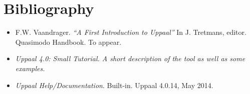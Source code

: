 \documentclass{beamer}
\begin{document}
\section{Bibliography}

\begin{frame}
	\begin{itemize}
		\item F.W. Vaandrager. \textit{``A First Introduction to Uppaal''} In J. Tretmans, editor. Quasimodo Handbook. To appear.
		\item \textit{Uppaal 4.0: Small Tutorial. A short description of the tool as well as some examples.}
		\item \textit{Uppaal Help/Documentation}. Built-in. Uppaal 4.0.14, May 2014.
	\end{itemize}
\end{frame}
\end{document}
